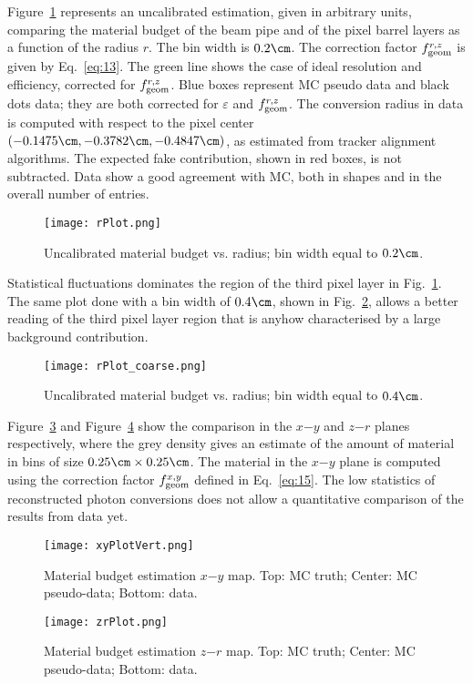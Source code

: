 Figure~\ref{figMBvsr} represents an uncalibrated estimation, given in arbitrary units, 
comparing the material budget of the beam pipe and of the pixel barrel layers as a function of the radius $r$. The bin width is $0.2\cm$.
The correction factor $f^{r, z}_{\rm geom}$ is given by Eq.~\ref{eq:13}.
The green line shows the case of ideal resolution and efficiency, corrected for $f^{r, z}_{\rm geom}$.
Blue boxes represent MC pseudo data and black dots data; they are both corrected for $\varepsilon$ and $f^{r, z}_{\rm geom}$.
The conversion radius in data is computed with respect to the pixel center $(-0.1475\cm, -0.3782\cm, -0.4847\cm)$, 
as estimated from tracker alignment algorithms. 
The expected fake contribution, shown in red boxes, is not subtracted. 
Data show a good agreement with MC, both in shapes and in the overall number of entries.

\begin{figure}[!htbp]
 \begin{center}
   \texttt{[image: rPlot.png]}
 \end{center}
 \caption{Uncalibrated material budget vs. radius; bin width equal to $0.2\cm$.}
\label{figMBvsr}
\end{figure}

Statistical fluctuations dominates the region of the third pixel layer in Fig.~\ref{figMBvsr}. The same plot done with a bin width of $0.4\cm$, shown in Fig.~\ref{figMBvsr_coarse}, allows a better reading of the third pixel layer region that is anyhow characterised by a large background contribution. 

\begin{figure}[!htbp]
 \begin{center}
   \texttt{[image: rPlot\_coarse.png]}
 \end{center}
 \caption{Uncalibrated material budget vs. radius; bin width equal to $0.4\cm$.}
\label{figMBvsr_coarse}
\end{figure}


Figure~\ref{xyPlot} and Figure~\ref{zrPlot} show the comparison in the $x$$-$$y$ and $z$$-$$r$ planes respectively, where the grey density 
gives an estimate of the amount of material in bins of size $0.25\cm\times0.25\cm$. 
The material in the $x$$-$$y$ plane is computed using the correction factor $f^{x, y}_{\rm geom}$ defined in Eq.~\ref{eq:15}.
The low statistics of reconstructed photon conversions does not allow a quantitative comparison of the results from data yet.

\begin{figure}[!hbtp]
\centering
\texttt{[image: xyPlotVert.png]}
\caption{Material budget estimation $x$$-$$y$ map. Top: MC truth; Center: MC pseudo-data; Bottom: data.}
\label{xyPlot}
\end{figure}

\begin{figure}[!hbtp]
\centering
\texttt{[image: zrPlot.png]}
\caption{Material budget estimation $z$$-$$r$ map. Top: MC truth; Center: MC pseudo-data; Bottom: data.}
\label{zrPlot}
\end{figure}
